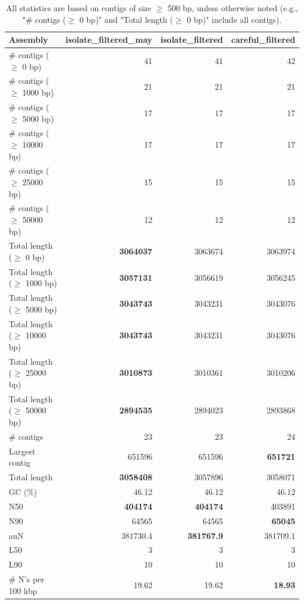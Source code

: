 \documentclass[12pt,a4paper]{article}
\begin{document}
\begin{table}[ht]
\begin{center}
\caption{All statistics are based on contigs of size $\geq$ 500 bp, unless otherwise noted (e.g., "\# contigs ($\geq$ 0 bp)" and "Total length ($\geq$ 0 bp)" include all contigs).}
\begin{tabular}{|l*{3}{|r}|}
\hline
Assembly & isolate\_filtered\_may & isolate\_filtered & careful\_filtered \\ \hline
\# contigs ($\geq$ 0 bp) & 41 & 41 & 42 \\ \hline
\# contigs ($\geq$ 1000 bp) & 21 & 21 & 21 \\ \hline
\# contigs ($\geq$ 5000 bp) & 17 & 17 & 17 \\ \hline
\# contigs ($\geq$ 10000 bp) & 17 & 17 & 17 \\ \hline
\# contigs ($\geq$ 25000 bp) & 15 & 15 & 15 \\ \hline
\# contigs ($\geq$ 50000 bp) & 12 & 12 & 12 \\ \hline
Total length ($\geq$ 0 bp) & {\bf 3064037} & 3063674 & 3063974 \\ \hline
Total length ($\geq$ 1000 bp) & {\bf 3057131} & 3056619 & 3056245 \\ \hline
Total length ($\geq$ 5000 bp) & {\bf 3043743} & 3043231 & 3043076 \\ \hline
Total length ($\geq$ 10000 bp) & {\bf 3043743} & 3043231 & 3043076 \\ \hline
Total length ($\geq$ 25000 bp) & {\bf 3010873} & 3010361 & 3010206 \\ \hline
Total length ($\geq$ 50000 bp) & {\bf 2894535} & 2894023 & 2893868 \\ \hline
\# contigs & 23 & 23 & 24 \\ \hline
Largest contig & 651596 & 651596 & {\bf 651721} \\ \hline
Total length & {\bf 3058408} & 3057896 & 3058071 \\ \hline
GC (\%) & 46.12 & 46.12 & 46.12 \\ \hline
N50 & {\bf 404174} & {\bf 404174} & 403891 \\ \hline
N90 & 64565 & 64565 & {\bf 65045} \\ \hline
auN & 381730.4 & {\bf 381767.9} & 381709.1 \\ \hline
L50 & 3 & 3 & 3 \\ \hline
L90 & 10 & 10 & 10 \\ \hline
\# N's per 100 kbp & 19.62 & 19.62 & {\bf 18.93} \\ \hline
\end{tabular}
\end{center}
\end{table}
\end{document}
